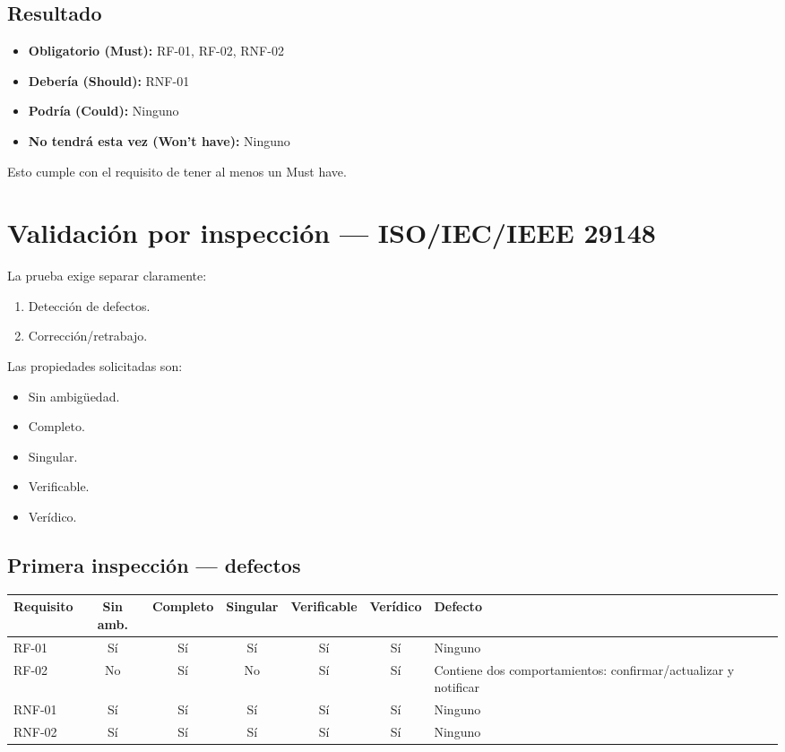 \documentclass[12pt,a4paper]{article}
\begin{document}
\subsection*{Resultado}

\begin{itemize}[nosep]
    \item \textbf{Obligatorio (Must):} RF-01, RF-02, RNF-02
    \item \textbf{Debería (Should):} RNF-01
    \item \textbf{Podría (Could):} Ninguno
    \item \textbf{No tendrá esta vez (Won't have):} Ninguno
\end{itemize}

Esto cumple con el requisito de tener al menos un Must have.

\section{Validación por inspección --- ISO/IEC/IEEE 29148}

La prueba exige separar claramente:

\begin{enumerate}[nosep]
    \item Detección de defectos.
    \item Corrección/retrabajo.
\end{enumerate}

Las propiedades solicitadas son:

\begin{itemize}[nosep]
    \item Sin ambigüedad.
    \item Completo.
    \item Singular.
    \item Verificable.
    \item Verídico.
\end{itemize}

\subsection*{Primera inspección --- defectos}

\begin{center}
\small
\begin{tabular}{lccccc p{3cm}}
\toprule
\textbf{Requisito} & \textbf{Sin amb.} & \textbf{Completo} & \textbf{Singular} & \textbf{Verificable} & \textbf{Verídico} & \textbf{Defecto} \\
\midrule
RF-01 & Sí & Sí & Sí & Sí & Sí & Ninguno \\
RF-02 & No & Sí & No & Sí & Sí & Contiene dos comportamientos: confirmar/actualizar y notificar \\
RNF-01 & Sí & Sí & Sí & Sí & Sí & Ninguno \\
RNF-02 & Sí & Sí & Sí & Sí & Sí & Ninguno \\
\bottomrule
\end{tabular}
\end{center}
\end{document}
